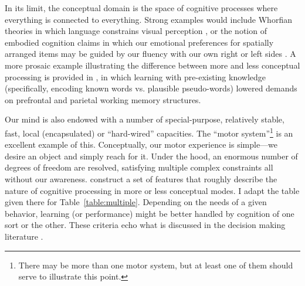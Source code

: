 In its limit, the conceptual domain is the space of cognitive processes where
everything is connected to everything. Strong examples would include Whorfian
theories in which language constrains visual perception
\cite{boroditsky_does_2001}, or the notion of embodied cognition claims in which
our emotional preferences for spatially arranged items may be guided by our
fluency with our own right or left sides \cite{casasanto_embodiment_2009}. A
more prosaic example illustrating the difference between more and less conceptual
processing is provided in \citeauthor{clark_assembling_2003}, in which learning with
pre-existing knowledge (specifically, encoding known words vs. plausible
pseudo-words) lowered demands on prefrontal and parietal working memory
structures.

Our mind is also endowed with a number of special-purpose, relatively stable,
fast, local (encapsulated) or ``hard-wired'' capacities. The ``motor
system''\footnote{There may be more than one motor system, but at least one of
them should serve to illustrate this point.} is an excellent example of this.
Conceptually, our motor experience is simple---we desire an object and simply
reach for it. Under the hood, an enormous number of degrees of freedom are
resolved, satisfying multiple complex constraints all without our awareness.
\citeauthor{clark_multiple_2010} construct a set of features that roughly describe
the nature of cognitive processing in more or less conceptual modes. I adapt the
table given there for Table~\ref{table:multiple}.  Depending on the needs of a
given behavior, learning (or performance) might be better handled by cognition
of one sort or the other. These criteria echo what is discussed in the decision
making literature \cite{kahneman_perspective_2003}.

